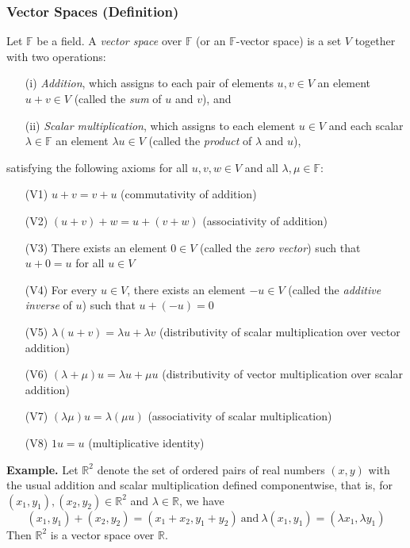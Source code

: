 \documentclass[12pt, a4paper]{article} %
\newcommand{\F}{\mathbb{F}}
\begin{document}
          \subsubsection{Vector Spaces (Definition)}

         Let $\F$ be a field. A \emph{vector space} over $\F$ (or an $\F$-vector space) is a set $V$ together with two operations:

         \begin{enumerate}
            \item[(i)] \emph{Addition}, which assigns to each pair of elements $u,v\in V$ an element $u+v\in V$ (called the \emph{sum} of $u$ and $v$), and
            \item[(ii)] \emph{Scalar multiplication}, which assigns to each element $u\in V$ and each scalar $\lambda\in \F$ an element $\lambda u\in V$ (called the \emph{product} of $\lambda$ and $u$),
         \end{enumerate}

         \vspace*{0.5cm}

         satisfying the following axioms for all $u,v,w\in V$ and all $\lambda,\mu\in \F$:

         \begin{enumerate}
            \item[(V1)] $u+v=v+u$ (commutativity of addition)
            \item[(V2)] $(u+v)+w=u+(v+w)$ (associativity of addition)
            \item[(V3)] There exists an element $0\in V$ (called the \emph{zero vector}) such that $u+0=u$ for all $u\in V$
           \item[(V4)] For every $u\in V$, there exists an element $-u\in V$ (called the \emph{additive inverse} of $u$) such that $u+(-u)=0$
           \item[(V5)] $\lambda(u+v)=\lambda u+\lambda v$ (distributivity of scalar multiplication over vector addition)
           \item[(V6)] $(\lambda+\mu)u=\lambda u+\mu u$ (distributivity of vector multiplication over scalar addition)
           \item[(V7)] $(\lambda\mu)u=\lambda(\mu u)$ (associativity of scalar multiplication)
           \item[(V8)] $1u=u$ (multiplicative identity)
         \end{enumerate}

         \textbf{Example.} Let $\mathbb{R}^2$ denote the set of ordered pairs of real numbers $(x,y)$ with the usual addition and scalar multiplication defined componentwise, that is, for $(x_1,y_1),(x_2,y_2)\in \mathbb{R}^2$ and $\lambda \in \mathbb{R}$, we have 
         \[(x_1, y_1) + (x_2, y_2) = (x_1 + x_2, y_1 + y_2)\  \mbox{and}\ \lambda(x_1, y_1) = (\lambda x_1, \lambda y_1)\]
         Then $\mathbb{R}^2$ is a vector space over $\mathbb{R}$.
        
\end{document}
